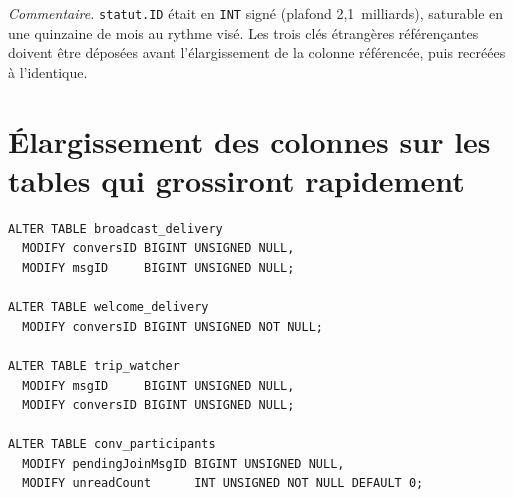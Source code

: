 \documentclass[a4paper,11pt]{article}
\begin{document}
\noindent\textit{Commentaire.} \texttt{statut.ID} était en \texttt{INT} signé (plafond 2,1~milliards), saturable en une quinzaine de mois au rythme visé. Les trois clés étrangères référençantes doivent être déposées avant l'élargissement de la colonne référencée, puis recréées à l'identique.

\section{Élargissement des colonnes sur les tables qui grossiront rapidement}

\begin{lstlisting}
ALTER TABLE broadcast_delivery
  MODIFY conversID BIGINT UNSIGNED NULL,
  MODIFY msgID     BIGINT UNSIGNED NULL;

ALTER TABLE welcome_delivery
  MODIFY conversID BIGINT UNSIGNED NOT NULL;

ALTER TABLE trip_watcher
  MODIFY msgID     BIGINT UNSIGNED NULL,
  MODIFY conversID BIGINT UNSIGNED NULL;

ALTER TABLE conv_participants
  MODIFY pendingJoinMsgID BIGINT UNSIGNED NULL,
  MODIFY unreadCount      INT UNSIGNED NOT NULL DEFAULT 0;
\end{lstlisting}
\end{document}
